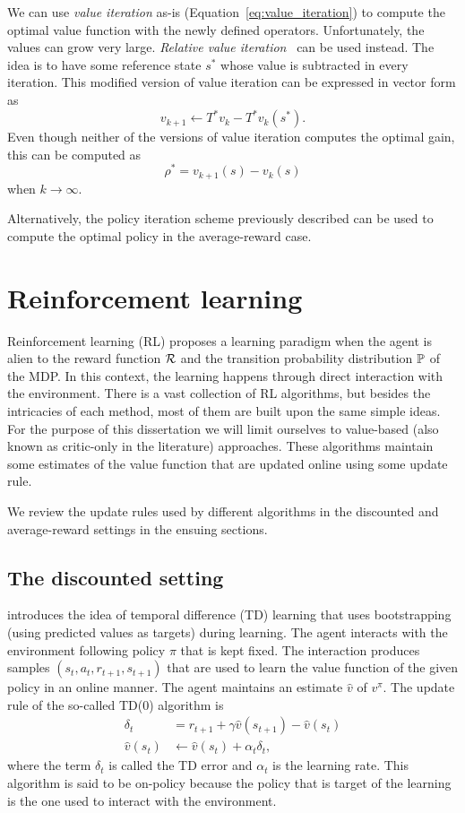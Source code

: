 We can use \textit{value iteration} as-is (Equation~\ref{eq:value_iteration}) to compute the optimal value function with the newly defined operators. Unfortunately, the values can grow very large. \textit{Relative value iteration}~\citep{White1963} can be used instead. The idea is to have some reference state $s^*$ whose value is subtracted in every iteration. This modified version of value iteration can be expressed in vector form as
\begin{equation}
    v_{k+1}\leftarrow T^* v_k - T^* v_k(s^*).
\end{equation}
Even though neither of the versions of value iteration computes the optimal gain, this can be computed as 
\begin{equation*}
  \rho^*=v
_{k+1}(s) - v_k(s)
\end{equation*}  when $k\rightarrow\infty$.

Alternatively, the policy iteration scheme previously described can be used to compute the optimal policy in the average-reward case.

\section{Reinforcement learning}
Reinforcement learning (RL) proposes a learning paradigm when the agent is alien to the reward function $\mathcal{R}$ and the transition probability distribution $\mathbb{P}$ of the MDP. In this context, the learning happens through direct interaction with the environment. There is a vast collection of RL algorithms, but besides the intricacies of each method, most of them are built upon the same simple ideas. For the purpose of this dissertation we will limit ourselves to value-based (also known as critic-only in the literature) approaches. These algorithms maintain some estimates of the value function that are updated online using some update rule.

We review the update rules  used by different algorithms in the discounted and average-reward settings in the ensuing sections.

\subsection{The discounted setting}
\citet{Sutton1988} introduces the idea of temporal difference (TD) learning that uses bootstrapping (using predicted values as targets) during learning. The agent interacts with the environment following policy $\pi$ that is kept fixed. The interaction produces samples ${(s_t, a_t, r_{t+1}, s_{t+1})}$ that are used to learn the value function of the given policy in an online manner. The agent maintains an estimate $\widehat v$ of $v^\pi$. The update rule of the so-called TD($0$) algorithm is
\begin{align}
  \delta_t &= r_{t+1} + \gamma \widehat v(s_{t+1}) - \widehat v(s_t)\\  
  \widehat v(s_t) &\leftarrow \widehat v(s_t) + \alpha_t \delta_t,
\end{align}
where the term $\delta_t$ is called the TD error and $\alpha_t$ is the learning rate. This algorithm is said to be on-policy because the policy that is target of the learning is the one used to interact with the environment. 

